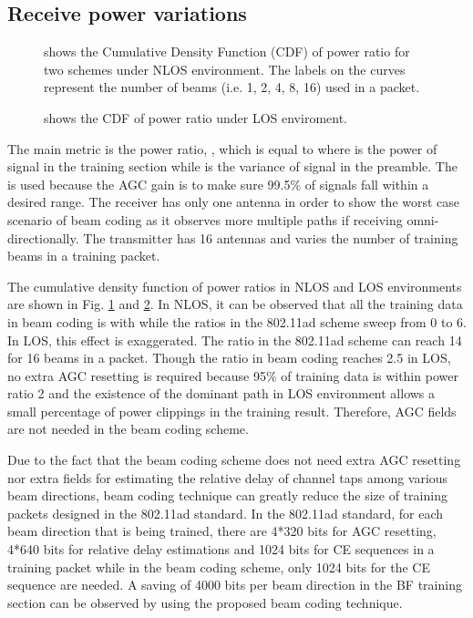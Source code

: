 \documentclass[10pt,conference]{IEEEtran}
\begin{document}
\subsection{Receive power variations}
\begin{figure}
\centering
{}
\caption{shows the Cumulative Density Function (CDF) of power ratio for two schemes under NLOS environment. The labels on the curves represent the number of beams (i.e. 1, 2, 4, 8, 16) used in a packet.}
\label{fig:power_var_NLOS}
\end{figure}
\begin{figure}
\centering
{}
\caption{shows the CDF of power ratio under LOS enviroment.}\label{fig:power_var_LOS}
\end{figure}






The main metric is the power ratio, , which is equal to  where  is the power of signal in the training section while  is the variance of signal in the preamble. The  is used because the AGC gain is to make sure 99.5\% of signals fall within a desired range. The receiver has only one antenna in order to show the worst case scenario of beam coding as it observes more multiple paths if receiving omni-directionally. The transmitter has 16 antennas and varies the number of training beams in a training packet.

The cumulative density function of power ratios in NLOS and LOS environments are shown in Fig. \ref{fig:power_var_NLOS} and \ref{fig:power_var_LOS}. In NLOS, it can be observed that all the training data in beam coding is with  while the ratios in the 802.11ad scheme sweep from 0 to 6. In LOS, this effect is exaggerated. The ratio in the 802.11ad scheme can reach 14 for 16 beams in a packet. Though the ratio in beam coding reaches 2.5 in LOS, no extra AGC resetting is required because 95\% of training data is within power ratio 2 and the existence of the dominant path in LOS environment allows a small percentage of power clippings in the training result. Therefore, AGC fields are not needed in the beam coding scheme.

Due to the fact that the beam coding scheme does not need extra AGC resetting nor extra fields for estimating the relative delay of channel taps among various beam directions, beam coding technique can greatly reduce the size of training packets designed in the 802.11ad standard. In the 802.11ad standard, for each beam direction that is being trained, there are 4*320 bits for AGC resetting, 4*640 bits for relative delay estimations and 1024 bits for CE sequences in a training packet while in the beam coding scheme, only 1024 bits for the CE sequence are needed. A saving of 4000 bits per beam direction in the BF training section can be observed by using the proposed beam coding technique.
\end{document}
